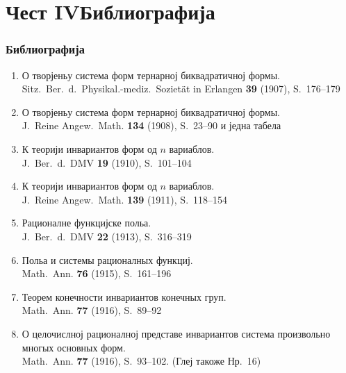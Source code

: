 \documentclass[11pt]{article}
\newcommand{\foreign}[1]{#1}
\begin{document}
\part*{Чест IV\hspace{1em}Библиографија}

\section*{Библиографија}

\begin{enumerate}[label={\small\arabic*.},leftmargin=2em,itemsep=0.3em]
\item О творјеньу система форм тернарној биквадратичној формы.\\
\foreign{Sitz.\ Ber.\ d.\ Physikal.-mediz.\ Sozietät in Erlangen} \textbf{39} (1907), S.~176--179

\item О творјеньу система форм тернарној биквадратичној формы.\\
\foreign{J.\ Reine Angew.\ Math.} \textbf{134} (1908), S.~23--90 и једна табела

\item К теорији инвариантов форм од $n$ вариаблов.\\
\foreign{J.\ Ber.\ d.\ DMV} \textbf{19} (1910), S.~101--104

\item К теорији инвариантов форм од $n$ вариаблов.\\
\foreign{J.\ Reine Angew.\ Math.} \textbf{139} (1911), S.~118--154

\item Рационалне функцијске польа.\\
\foreign{J.\ Ber.\ d.\ DMV} \textbf{22} (1913), S.~316--319

\item Польа и системы рационалных функциј.\\
\foreign{Math.\ Ann.} \textbf{76} (1915), S.~161--196

\item Теорем конечности инвариантов конечных груп.\\
\foreign{Math.\ Ann.} \textbf{77} (1916), S.~89--92

\item О целочислној рационалној представе инвариантов система произвольно многых основных форм.\\
\foreign{Math.\ Ann.} \textbf{77} (1916), S.~93--102. (Глеј такоже Нр.~16)


\end{enumerate}
\end{document}
